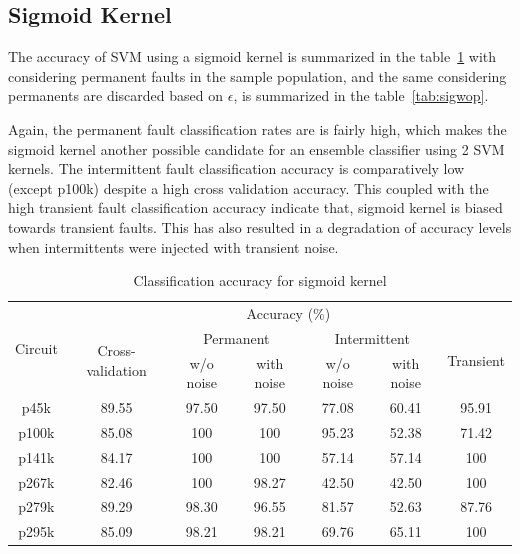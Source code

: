 \subsection{Sigmoid Kernel}

The accuracy of SVM using a sigmoid kernel is summarized in the table~\ref{tab:sigwp} with considering permanent faults in the sample population, and the same considering permanents are discarded based on $\epsilon$, is summarized in the table~\ref{tab:sigwop}.

Again, the permanent fault classification rates are is fairly high, which makes the sigmoid kernel another possible candidate for an ensemble classifier using 2 SVM kernels. The intermittent fault classification accuracy is comparatively low (except p100k) despite a high cross validation accuracy. This coupled with the high transient fault classification accuracy indicate that, sigmoid kernel is biased towards transient faults. This has also resulted in a degradation of accuracy levels when intermittents were injected with transient noise.

\begin{table}[h]

	\captionsetup{justification=centering}
\begin{tabular}{ccccccc}
\hline
\multirow{3}{*}{Circuit} & \multicolumn{6}{c}{Accuracy (\%)}\\ \cline{2-7} 
                         & \multirow{2}{*}{Cross-validation} & \multicolumn{2}{c}{Permanent} & \multicolumn{2}{c}{Intermittent} & \multirow{2}{*}{Transient} \\ \cline{3-6}
                         &                                   & w/o noise     & with noise    & w/o noise      & with noise      &                            \\ \hline
p45k                     & 89.55                             & 97.50         & 97.50         & 77.08          & 60.41           & 95.91                      \\
p100k                    & 85.08                             & 100           & 100           & 95.23          & 52.38           & 71.42                      \\
p141k                    & 84.17                             & 100           & 100           & 57.14          & 57.14           & 100                        \\
p267k                    & 82.46                             & 100           & 98.27         & 42.50          & 42.50           & 100                        \\
p279k                    & 89.29                             & 98.30         & 96.55         & 81.57          & 52.63           & 87.76                      \\
p295k                    & 85.09                             & 98.21         & 98.21         & 69.76          & 65.11           & 100                       \\
\hline                                                     
\end{tabular}
\caption {Classification accuracy for sigmoid kernel}
\label{tab:sigwp}
\end{table}

